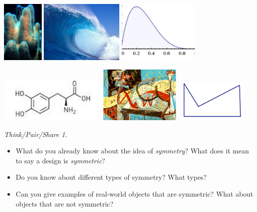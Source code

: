 \documentclass[12pt, reqno]{amsart}
\theoremstyle{remark}
\newtheorem*{thinkpair*}{Think/Pair/Share}
\theoremstyle{definition}
\numberwithin{equation}{section}  %
\begin{document}
\begin{center}
\includegraphics[height=3cm]{asymm1}
\qquad
\includegraphics[height=3cm]{asymm2}
\qquad
\includegraphics[height=3cm]{asymm4}



\includegraphics[height=2.2cm]{asymm3}
\ 
\includegraphics[height=2.7cm]{asymm5}
\ 
\includegraphics[height=2cm]{asymm6}
\end{center}

\bigskip


\begin{thinkpair*}\ 
\begin{itemize}
\item
What do you already know about the idea of \emph{symmetry}?  What does it mean to say a design is \emph{symmetric}?\\  
\item
Do you know about different types of symmetry?  What types?\\
\item
 Can you give examples of real-world objects that are symmetric?  What about objects that  are not symmetric?
 \end{itemize}
\end{thinkpair*}
\end{document}
